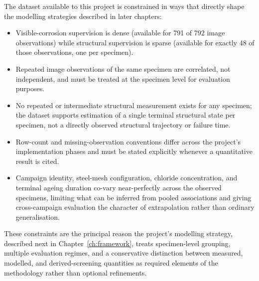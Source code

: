 The dataset available to this project is constrained in ways that
directly shape the modelling strategies described in later chapters:

\begin{itemize}
\item Visible-corrosion supervision is dense (available for 791 of 792
image observations) while structural supervision is sparse (available for
exactly 48 of those observations, one per specimen).
\item Repeated image observations of the same specimen are correlated, not
independent, and must be treated at the specimen level for evaluation
purposes.
\item No repeated or intermediate structural measurement exists for any
specimen; the dataset supports estimation of a single terminal structural
state per specimen, not a directly observed structural trajectory or
failure time.
\item Row-count and missing-observation conventions differ across the
project's implementation phases and must be stated explicitly whenever a
quantitative result is cited.
\item Campaign identity, steel-mesh configuration, chloride concentration,
and terminal ageing duration co-vary near-perfectly across the observed
specimens, limiting what can be inferred from pooled associations and
giving cross-campaign evaluation the character of extrapolation rather
than ordinary generalisation.
\end{itemize}

These constraints are the principal reason the project's modelling
strategy, described next in Chapter~\ref{ch:framework}, treats
specimen-level grouping, multiple evaluation regimes, and a conservative
distinction between measured, modelled, and derived-screening quantities
as required elements of the methodology rather than optional refinements.
